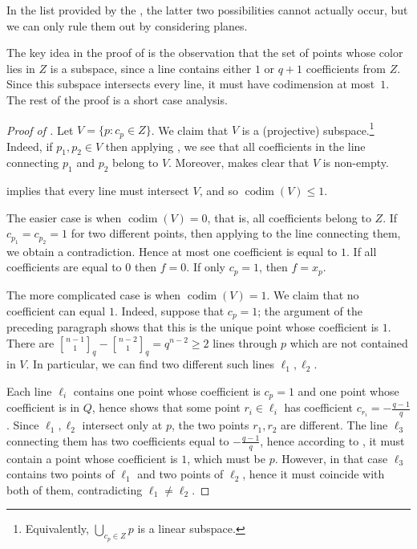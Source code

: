 \documentclass{article}
\theoremstyle{definition}
\providecommand{\sqbinom}[2]{\genfrac{[}{]}{0pt}{}{#1}{#2}}
\DeclareMathOperator{\codim}{codim}
\begin{document}
In the list provided by the , the latter two possibilities cannot actually occur, but we can only rule them out by considering planes.

The key idea in the proof of  is the observation that the set of points whose color lies in $Z$ is a subspace, since a line contains either $1$ or $q+1$ coefficients from $Z$. Since this subspace intersects every line, it must have codimension at most~$1$. The rest of the proof is a short case analysis.

\begin{proof}[Proof of ]
Let $V = \{ p : c_p \in Z \}$. We claim that $V$ is a (projective) subspace.\footnote{Equivalently, $\bigcup_{c_p \in Z} p$ is a linear subspace.} Indeed, if $p_1,p_2 \in V$ then applying , we see that all coefficients in the line connecting $p_1$ and $p_2$ belong to $V$. Moreover,  makes clear that $V$ is non-empty.

 implies that every line must intersect $V$, and so $\codim(V) \leq 1$.

The easier case is when $\codim(V) = 0$, that is, all coefficients belong to $Z$. If $c_{p_1} = c_{p_2} = 1$ for two different points, then applying  to the line connecting them, we obtain a contradiction. Hence at most one coefficient is equal to $1$. If all coefficients are equal to $0$ then $f = 0$. If only $c_p = 1$, then $f = x_p$.

The more complicated case is when $\codim(V) = 1$. We claim that no coefficient can equal $1$. Indeed, suppose that $c_p = 1$; the argument of the preceding paragraph shows that this is the unique point whose coefficient is $1$. There are $\sqbinom{n-1}{1}_q - \sqbinom{n-2}{1}_q = q^{n-2} \ge 2$ lines through $p$ which are not contained in $V$. In particular, we can find two different such lines $\ell_1,\ell_2$.

Each line $\ell_i$ contains one point whose coefficient is $c_p = 1$ and one point whose coefficient is in $Q$, hence  shows that some point $r_i \in \ell_i$ has coefficient $c_{r_i} = -\frac{q-1}{q}$. Since $\ell_1,\ell_2$ intersect only at $p$, the two points $r_1,r_2$ are different. The line $\ell_3$ connecting them has two coefficients equal to $-\frac{q-1}{q}$, hence according to , it must contain a point whose coefficient is $1$, which must be $p$. However, in that case $\ell_3$ contains two points of $\ell_1$ and two points of $\ell_2$, hence it must coincide with both of them, contradicting $\ell_1 \neq \ell_2$.


\end{proof}
\end{document}
